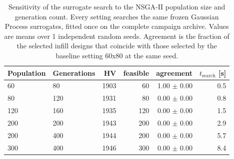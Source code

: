 \begin{table}[htbp]
\centering
\caption{Sensitivity of the surrogate search to the NSGA-II population size and generation count. Every setting searches the same frozen Gaussian Process surrogates, fitted once on the complete campaign archive. Values are means over 1 independent random seeds. Agreement is the fraction of the selected infill designs that coincide with those selected by the baseline setting 60x80 at the same seed.}
\label{tab:nsga_sensitivity}
\begin{tabular}{llrrrr}
\toprule
Population & Generations & HV & feasible & agreement & $t_{\mathrm{search}}$ [s] \\
\midrule
60 & 80 & 1903 & 60 & 1.00 $\pm$ 0.00 & 0.5 \\
80 & 120 & 1931 & 80 & 0.00 $\pm$ 0.00 & 0.8 \\
120 & 160 & 1935 & 120 & 0.00 $\pm$ 0.00 & 1.5 \\
200 & 200 & 1943 & 200 & 0.00 $\pm$ 0.00 & 2.9 \\
200 & 400 & 1944 & 200 & 0.00 $\pm$ 0.00 & 5.7 \\
300 & 400 & 1946 & 300 & 0.00 $\pm$ 0.00 & 8.4 \\
\bottomrule
\end{tabular}
\end{table}
